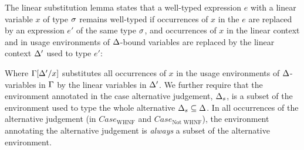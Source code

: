 
The linear substitution lemma states that a well-typed expression $e$ with a
linear variable $x$ of type $\sigma$ remains well-typed if
occurrences of $x$ in the $e$ are replaced by an expression $e'$ of the same
type $\sigma$, and occurrences of $x$ in the linear context and in usage
environments of $\Delta$-bound variables are replaced by the linear context $\Delta'$
used to type $e'$:
\LinearSubstitutionLemma

\noindent Where $\Gamma[\Delta'/x]$ substitutes all occurrences of $x$ in the usage
environments of $\Delta$-variables in $\Gamma$ by the linear variables in
$\Delta'$.
We further require that the environment annotated in the case
alternative judgement, $\Delta_s$, is a subset of the environment used to type the
whole alternative $\Delta_s \subseteq \Delta$. In all occurrences of the alternative
judgement (in $Case_{\textrm{WHNF}}$ and $Case_{\textrm{Not WHNF}}$), the
environment annotating the alternative judgement is \emph{always} a subset of
the alternative environment.




